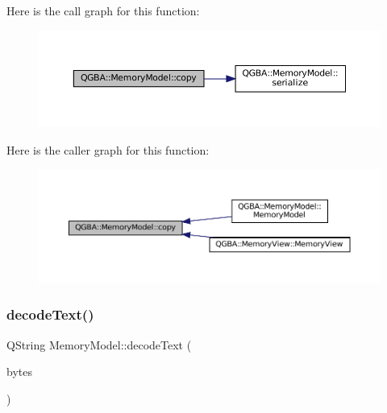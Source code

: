 Here is the call graph for this function\+:
\nopagebreak
\begin{figure}[H]
\begin{center}
\leavevmode
\includegraphics[width=350pt]{class_q_g_b_a_1_1_memory_model_a70a88aa956fa14bd0a6f4cec769f7bb3_cgraph}
\end{center}
\end{figure}
Here is the caller graph for this function\+:
\nopagebreak
\begin{figure}[H]
\begin{center}
\leavevmode
\includegraphics[width=350pt]{class_q_g_b_a_1_1_memory_model_a70a88aa956fa14bd0a6f4cec769f7bb3_icgraph}
\end{center}
\end{figure}
\mbox{\label{class_q_g_b_a_1_1_memory_model_a9638dd27a9e7aec61fe5c8850dd5b414}} 
\subsubsection{\texorpdfstring{decode\+Text()}{decodeText()}}
{\footnotesize\ttfamily Q\+String Memory\+Model\+::decode\+Text (\begin{DoxyParamCaption}\item[{const Q\+Byte\+Array \&}]{bytes }\end{DoxyParamCaption})}

